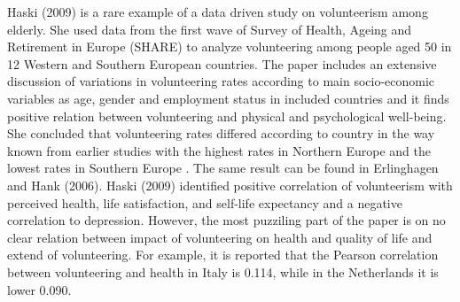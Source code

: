 \documentclass[10pt, letterpaper]{article}
\newcommand{\emd}[1]{\ExecuteMetaData[/tmp/tex]{#1}} %
\begin{document}
\begin{spacing}{1.4} %





Haski (2009) is a rare example of a data driven study on volunteerism among elderly. She used data from the first wave of Survey of Health, Ageing and Retirement in Europe (SHARE) to analyze volunteering among people aged 50 in 12 Western and Southern European countries.  The paper includes an extensive discussion of variations in volunteering rates according to main socio-economic variables as age, gender and employment status in included countries and it finds positive relation between volunteering and physical and psychological well-being. She concluded that volunteering rates differed according to country  in the way known from earlier studies with the highest rates in Northern Europe and the lowest rates in Southern Europe . The same result can be found in Erlinghagen and Hank  (2006).  Haski (2009) identified  positive correlation of  volunteerism  with perceived health, life satisfaction, and self-life expectancy and a negative correlation to depression.  However, the most puzziling part of the paper is on no clear relation between impact of volunteering on health and quality of life and extend of volunteering. For example, it is reported that the Pearson correlation  between volunteering and health in Italy  is 0.114, while in the Netherlands it is lower 0.090. \\


\end{spacing}
\end{document}
